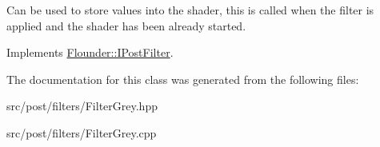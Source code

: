 Can be used to store values into the shader, this is called when the filter is applied and the shader has been already started. 



Implements \hyperlink{class_flounder_1_1_i_post_filter_a20420ec0a9bac67437740552bea9ab74}{Flounder\+::\+I\+Post\+Filter}.



The documentation for this class was generated from the following files\+:\begin{DoxyCompactItemize}
\item 
src/post/filters/Filter\+Grey.\+hpp\item 
src/post/filters/Filter\+Grey.\+cpp\end{DoxyCompactItemize}
